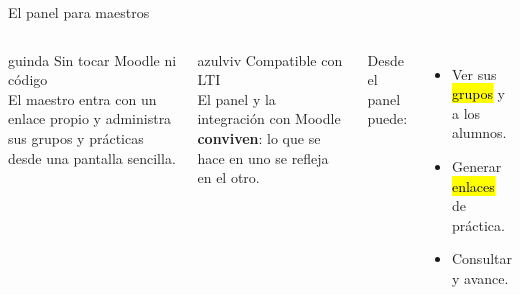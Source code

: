 \begin{frame}{El panel para maestros}
\vspace{0.25cm}
\begin{columns}[T]
\begin{tarjetabox}{guinda}
{\demi\color{guinda}Sin tocar Moodle ni c\'odigo}\\[3pt]
El maestro entra con un enlace propio y administra sus grupos y pr\'acticas desde
una pantalla sencilla.
\end{tarjetabox}
\begin{tarjetabox}{azulviv}
{\demi\color{azulviv}Compatible con LTI}\\[3pt]
El panel y la integraci\'on con Moodle \textbf{conviven}: lo que se hace en uno se
refleja en el otro.
\end{tarjetabox}
Desde el panel puede:
\begin{itemize}\setlength\itemsep{4pt}
  \item Ver sus \hl{grupos} y a los alumnos.
  \item Generar \hl{enlaces} de pr\'actica.
  \item Consultar  y avance.
\end{itemize}
\end{columns}
\end{frame}

